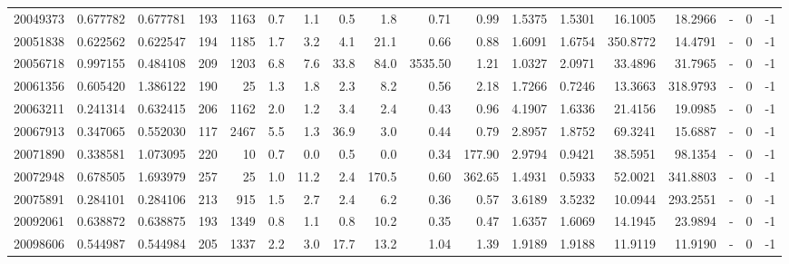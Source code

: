 \begin{tabular}{rrrrrrrrrrrrrrrlrr}
  20049373 & 0.677782 &   0.677781 &  193 & 1163 &      0.7 &      1.1 &     0.5 &      1.8 &       0.71 &        0.99 &  1.5375 &  1.5301 &   16.1005 &   18.2966 &             - &        0 &         -1 \\
  20051838 & 0.622562 &   0.622547 &  194 & 1185 &      1.7 &      3.2 &     4.1 &     21.1 &       0.66 &        0.88 &  1.6091 &  1.6754 &  350.8772 &   14.4791 &             - &        0 &         -1 \\
  20056718 & 0.997155 &   0.484108 &  209 & 1203 &      6.8 &      7.6 &    33.8 &     84.0 &    3535.50 &        1.21 &  1.0327 &  2.0971 &   33.4896 &   31.7965 &             - &        0 &         -1 \\
  20061356 & 0.605420 &   1.386122 &  190 &   25 &      1.3 &      1.8 &     2.3 &      8.2 &       0.56 &        2.18 &  1.7266 &  0.7246 &   13.3663 &  318.9793 &             - &        0 &         -1 \\
  20063211 & 0.241314 &   0.632415 &  206 & 1162 &      2.0 &      1.2 &     3.4 &      2.4 &       0.43 &        0.96 &  4.1907 &  1.6336 &   21.4156 &   19.0985 &             - &        0 &         -1 \\
  20067913 & 0.347065 &   0.552030 &  117 & 2467 &      5.5 &      1.3 &    36.9 &      3.0 &       0.44 &        0.79 &  2.8957 &  1.8752 &   69.3241 &   15.6887 &             - &        0 &         -1 \\
  20071890 & 0.338581 &   1.073095 &  220 &   10 &      0.7 &      0.0 &     0.5 &      0.0 &       0.34 &      177.90 &  2.9794 &  0.9421 &   38.5951 &   98.1354 &             - &        0 &         -1 \\
  20072948 & 0.678505 &   1.693979 &  257 &   25 &      1.0 &     11.2 &     2.4 &    170.5 &       0.60 &      362.65 &  1.4931 &  0.5933 &   52.0021 &  341.8803 &             - &        0 &         -1 \\
  20075891 & 0.284101 &   0.284106 &  213 &  915 &      1.5 &      2.7 &     2.4 &      6.2 &       0.36 &        0.57 &  3.6189 &  3.5232 &   10.0944 &  293.2551 &             - &        0 &         -1 \\
  20092061 & 0.638872 &   0.638875 &  193 & 1349 &      0.8 &      1.1 &     0.8 &     10.2 &       0.35 &        0.47 &  1.6357 &  1.6069 &   14.1945 &   23.9894 &             - &        0 &         -1 \\
  20098606 & 0.544987 &   0.544984 &  205 & 1337 &      2.2 &      3.0 &    17.7 &     13.2 &       1.04 &        1.39 &  1.9189 &  1.9188 &   11.9119 &   11.9190 &             - &        0 &         -1 \\

\end{tabular}

